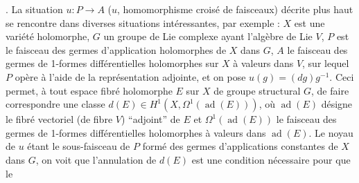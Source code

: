 . La situation $u:P\to A$ ($u$, homomorphisme croisé de
faisceaux) décrite plus haut se rencontre dans diverses situations
intéressantes, par exemple : $X$ est une variété holomorphe, $G$ un groupe de
Lie complexe ayant l'algèbre de Lie $V$, $P$ est le faisceau des germes
d'application holomorphes de $X$ dans $G$, $A$ le faisceau des germes de
1-formes différentielles holomorphes sur $X$ à valeurs dans $V$, sur lequel
$P$ opère à l'aide de la représentation adjointe, et on pose
$u(g)=(dg)g^{-1}$.
Ceci permet, à tout espace fibré holomorphe $E$ sur $X$ de groupe structural
$G$, de faire correspondre
une classe
$d(E)\in H^1(X,\Omega^1(\operatorname{ad}(E)))$,
où $\operatorname{ad}(E)$ désigne le fibré vectoriel (de fibre $V$)
``adjoint'' de $E$ et $\Omega^1(\operatorname{ad}(E))$ le faisceau des
germes de 1-formes différentielles holomorphes à valeurs dans
$\operatorname{ad}(E)$.
Le noyau de $u$ étant le sous-faisceau de $P$ formé des germes d'applications
constantes de $X$ dans $G$, on voit que l'annulation de $d(E)$ est une
condition nécessaire pour que le

